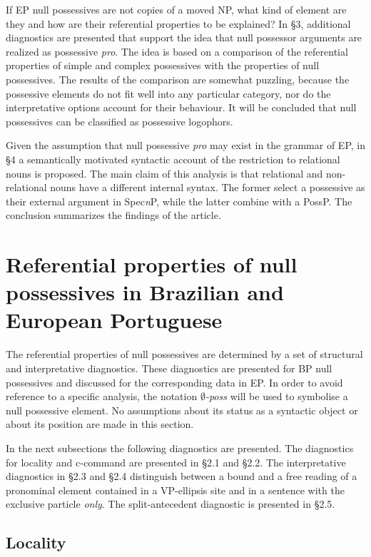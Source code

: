 \documentclass[output=paper]{langsci/langscibook}
\begin{document}
If EP null possessives are not copies of a moved NP, what kind of element are they and how are their referential properties to be explained? In §3, additional diagnostics are presented that support the idea that null possessor arguments are realized as possessive \textit{pro}. The idea is based on a comparison of the referential properties of simple and complex possessives with the properties of null possessives. The results of the comparison are somewhat puzzling, because the possessive elements do not fit well into any particular category, nor do the interpretative options account for their behaviour. It will be concluded that null possessives can be classified as possessive logophors.

Given the assumption that null possessive \textit{pro} may exist in the grammar of EP, in §4 a semantically motivated syntactic account of the restriction to relational nouns is proposed. The main claim of this analysis is that relational and non-relational nouns have a different internal syntax. The former select a possessive as their external argument in Spec\textit{n}P, while the latter combine with a PossP. The conclusion summarizes the findings of the article.

\section{Referential properties of null possessives in Brazilian and European Portuguese}%

The referential properties of null possessives are determined by a set of structural and interpretative diagnostics. These diagnostics are presented for BP null possessives and discussed for the corresponding data in EP. In order to avoid reference to a specific analysis, the notation \textit{$\emptyset$-poss} will be used to symbolise a null possessive element. No assumptions about its status as a syntactic object or about its position are made in this section.  

In the next subsections the following diagnostics are presented. The diagnostics for locality and c-command are presented in §2.1 and §2.2. The interpretative diagnostics in §2.3 and §2.4 distinguish between a bound and a free reading of a pronominal element contained in a VP-ellipsis site and in a sentence with the exclusive particle \textit{only}. The split-antecedent diagnostic is presented in §2.5.

\subsection{Locality}%
\end{document}
